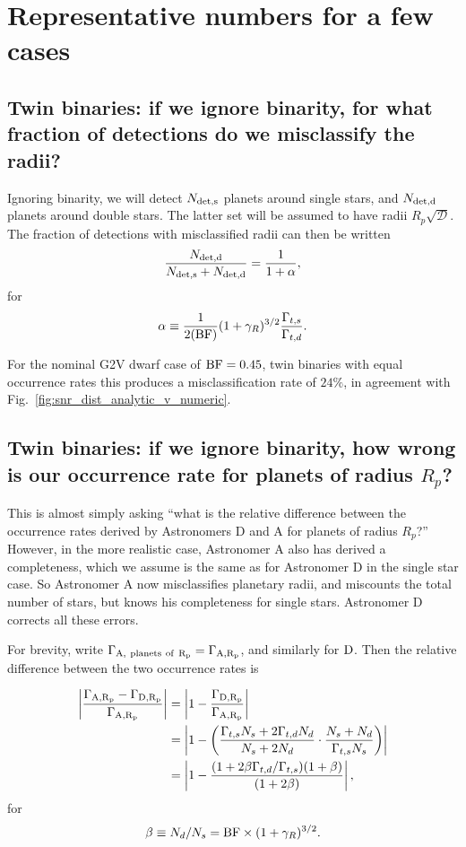 \documentclass{emulateapj}
\begin{document}
\section{Representative numbers for a few cases}

\subsection{Twin binaries: if we ignore binarity, for what fraction of 
detections do we misclassify the radii?}
 
Ignoring binarity, we will detect $N_{\rm det,s}$ planets around single stars, 
and $N_{\rm det,d}$ planets around double stars. The latter set will be assumed 
to have radii $R_p \sqrt{\mathcal{D}}$.
The fraction of detections with misclassified radii can then be written
\begin{equation}
\frac{N_{\rm det,d}}{N_{\rm det,s} + N_{\rm det,d}} = \frac{1}{1+\alpha},
\end{equation}
for
\begin{equation}
\alpha \equiv \frac{1}{2({\rm BF})} (1+\gamma_R)^{3/2} 
\frac{\Gamma_{t,s}}{\Gamma_{t,d}}.
\end{equation}

For the nominal G2V dwarf case of ${\rm BF}=0.45$, twin binaries with equal 
occurrence rates this produces a misclassification rate of $24\%$, in agreement 
with Fig.~\ref{fig:snr_dist_analytic_v_numeric}.

\subsection{Twin binaries: if we ignore binarity, how wrong is our occurrence 
rate for planets of radius $R_p$?}

This is almost simply asking ``what is the relative difference between the 
occurrence rates derived by Astronomers D and A for planets of radius $R_p$?''
However, in the more realistic case, Astronomer A also has derived a 
completeness, which we assume is the same as for Astronomer D in the single 
star case.
So Astronomer A now misclassifies planetary radii, and miscounts the total 
number of stars, but knows his completeness for single stars.
Astronomer D corrects all these errors.

For brevity, write $\Gamma_{\rm A,\ planets\ of\ R_p} = \Gamma_{\rm A,R_p}$, 
and similarly for ${\rm D}$.
Then the relative difference between the two occurrence rates is

\begin{align}
\left|\frac{\Gamma_{\rm A,R_p} - \Gamma_{\rm D,R_p}}
		   {\Gamma_{\rm A,R_p}} \right| &=
\left| 1 - \frac{\Gamma_{\rm D,R_p}}{\Gamma_{\rm A,R_p}}\right| \\
&=
\left| 1 - \left(\frac{\Gamma_{t,s}N_s + 2\Gamma_{t,d}N_d}{N_s + 2N_d}  \cdot 
\frac{N_s + N_d}{\Gamma_{t,s} N_s }\right)\right| \\
&= 
\left|
1 - \frac{(1 + 2 \beta \Gamma_{t,d}/\Gamma_{t,s})(1 + \beta)}{(1+2\beta)}
\right|,
\end{align}
for
\begin{equation}
\beta \equiv N_d/N_s = {\rm BF} \times (1+\gamma_R)^{3/2}.
\end{equation}
\end{document}
